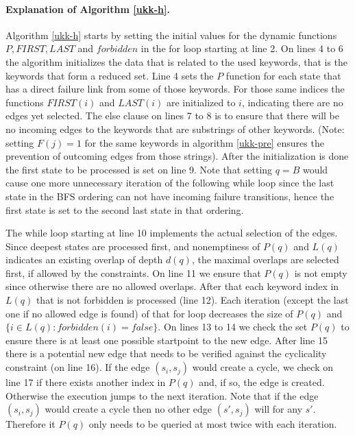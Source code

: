 \documentclass[english,twoside,censored,csm,algorithms-track-2020]{HYthesisML}
\theoremstyle{plain}
\theoremstyle{definition}
\begin{document}
\paragraph{Explanation of Algorithm \ref{ukk-h}.}
Algorithm \ref{ukk-h} starts by setting the initial values for the dynamic functions
$P, FIRST, LAST$ and $forbidden$ in the for loop starting at line 2. On lines 4 to 6 the algorithm
initializes the data that is related to the used keywords, that is the keywords that form a reduced set.
Line 4 sets the $P$ function for each state that has a direct failure link from some of
those keywords. For those same indices the functions $FIRST(i)$ and $LAST(i)$ are initialized
to $i$, indicating there are no edges yet selected. The else clause on lines 7 to 8 is
to ensure that there will be no incoming edges to the keywords that are substrings of other
keywords. (Note: setting $F(j) = 1$ for the same keywords in algorithm \ref{ukk-pre} ensures
the prevention of outcoming edges from those strings). After the initialization is done the
first state to be processed is set on line 9. Note that setting $q=B$ would cause one more unnecessary
iteration of the following while loop since the last state in the BFS ordering can not have
incoming failure transitions, hence the first state is set to the second last state in that
ordering.

The while loop starting at line 10 implements the actual selection of the edges. Since
deepest states are processed first, and nonemptiness of $P(q)$ and $L(q)$ indicates an existing
overlap of depth $d(q)$, the maximal overlaps are selected first, if allowed by the constraints.
On line 11 we ensure that $P(q)$ is not empty since otherwise there are no allowed overlaps.
After that each keyword index in $L(q)$ that is not forbidden is processed (line 12). Each
iteration (except the last one if no allowed edge is found) of that for loop decreases the
size of $P(q)$ and $\{i\in L(q) : forbidden(i) = false\}$. On lines 13 to 14 we check 
the set $P(q)$ to ensure there is at least one possible startpoint to the new edge. After line 15
there is a potential new edge that needs to be verified against the cyclicality constraint
(on line 16). If the edge $(s_i,s_j)$ would create a cycle, we check on line 17 if there exists
another index in $P(q)$ and, if so, the edge is created. Otherwise the execution jumps to the
next iteration. Note that if the edge $(s_i,s_j)$ would create a cycle then no other edge $(s',s_j)$
will for any $s'$. Therefore it $P(q)$ only needs to be queried at most twice with each iteration.
\end{document}
